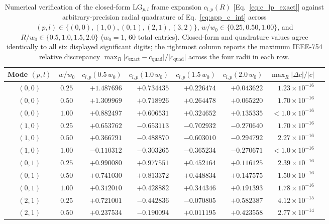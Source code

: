 \documentclass[aps,pra,onecolumn,notitlepage,11pt,tightenlines,amsmath,amssymb,floatfix,longbibliography]{revtex4-2}
\providecommand{\abs}[1]{\lvert#1\rvert}
\begin{document}
\begin{table}[t]
\caption{Numerical verification of the closed-form $\mathrm{LG}_{p,l}$ frame expansion $c_{l,p}(R)$ [Eq.~\eqref{eq:c_lp_exact}] against arbitrary-precision radial quadrature of Eq.~\eqref{eq:app_c_int} across $(p,l) \in \{(0,0),(1,0),(0,1),(2,1),(3,2)\}$, $w/w_0 \in \{0.25, 0.50, 1.00\}$, and $R/w_0 \in \{0.5, 1.0, 1.5, 2.0\}$ ($w_0 = 1$, 60 total entries). Closed-form and quadrature values agree identically to all six displayed significant digits; the rightmost column reports the maximum IEEE-754 relative discrepancy $\max_R \abs{c_{\mathrm{exact}} - c_{\mathrm{quad}}}/\abs{c_{\mathrm{quad}}}$ across the four radii in each row.}
\label{tab:c_lp_verification}
\begin{ruledtabular}
\footnotesize
\setlength{\tabcolsep}{4pt}
\begin{tabular}{ccrrrrrc}
Mode $(p,l)$ & $w / w_0$ & $c_{l,p}(0.5\,w_0)$ & $c_{l,p}(1.0\,w_0)$ & $c_{l,p}(1.5\,w_0)$ & $c_{l,p}(2.0\,w_0)$ & $\max_R \abs{\Delta c}/\abs{c}$ \\
\hline
$(0,0)$ & $0.25$ & $+1.487696$ & $+0.734435$ & $+0.226474$ & $+0.043622$ & $1.23\times 10^{-16}$ \\
$(0,0)$ & $0.50$ & $+1.309969$ & $+0.718926$ & $+0.264478$ & $+0.065220$ & $1.70\times 10^{-16}$ \\
$(0,0)$ & $1.00$ & $+0.882497$ & $+0.606531$ & $+0.324652$ & $+0.135335$ & $<1.0\times 10^{-16}$ \\
\hline
$(1,0)$ & $0.25$ & $+0.653762$ & $-0.653113$ & $-0.702932$ & $-0.270640$ & $1.70\times 10^{-16}$ \\
$(1,0)$ & $0.50$ & $+0.366791$ & $-0.488870$ & $-0.603010$ & $-0.294792$ & $2.27\times 10^{-16}$ \\
$(1,0)$ & $1.00$ & $-0.110312$ & $-0.303265$ & $-0.365234$ & $-0.270671$ & $<1.0\times 10^{-16}$ \\
\hline
$(0,1)$ & $0.25$ & $+0.990080$ & $+0.977551$ & $+0.452164$ & $+0.116125$ & $2.39\times 10^{-16}$ \\
$(0,1)$ & $0.50$ & $+0.741030$ & $+0.813372$ & $+0.448834$ & $+0.147575$ & $1.50\times 10^{-16}$ \\
$(0,1)$ & $1.00$ & $+0.312010$ & $+0.428882$ & $+0.344346$ & $+0.191393$ & $1.78\times 10^{-16}$ \\
\hline
$(2,1)$ & $0.25$ & $+0.721001$ & $-0.442836$ & $-0.070805$ & $+0.582387$ & $4.12\times 10^{-15}$ \\
$(2,1)$ & $0.50$ & $+0.237534$ & $-0.190094$ & $+0.011195$ & $+0.423558$ & $2.77\times 10^{-14}$ \\

\end{tabular}
\end{ruledtabular}
\end{table}
\end{document}
